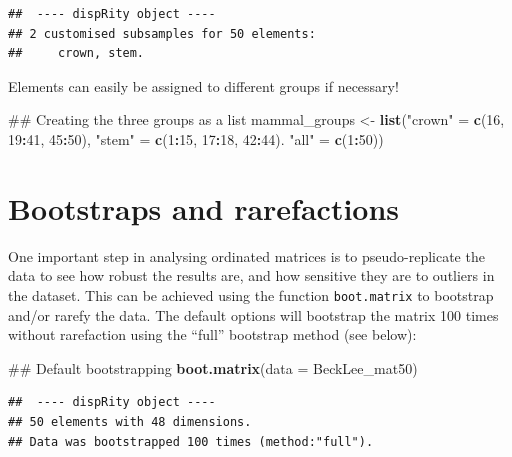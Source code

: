 \documentclass[]{book}
\newenvironment{Shaded}{\begin{snugshade}}{\end{snugshade}}
\newcommand{\KeywordTok}[1]{\textcolor[rgb]{0.13,0.29,0.53}{\textbf{#1}}}
\newcommand{\DataTypeTok}[1]{\textcolor[rgb]{0.13,0.29,0.53}{#1}}
\newcommand{\DecValTok}[1]{\textcolor[rgb]{0.00,0.00,0.81}{#1}}
\newcommand{\StringTok}[1]{\textcolor[rgb]{0.31,0.60,0.02}{#1}}
\newcommand{\OperatorTok}[1]{\textcolor[rgb]{0.81,0.36,0.00}{\textbf{#1}}}
\newcommand{\NormalTok}[1]{#1}
\theoremstyle{definition}
\theoremstyle{definition}
\theoremstyle{remark}
\begin{document}
\begin{verbatim}
##  ---- dispRity object ---- 
## 2 customised subsamples for 50 elements:
##     crown, stem.
\end{verbatim}

Elements can easily be assigned to different groups if necessary!

\begin{Shaded}
\begin{Highlighting}[]
\NormalTok{## Creating the three groups as a list}
\NormalTok{mammal_groups <-}\StringTok{ }\KeywordTok{list}\NormalTok{(}\StringTok{"crown"}\NormalTok{ =}\StringTok{ }\KeywordTok{c}\NormalTok{(}\DecValTok{16}\NormalTok{, }\DecValTok{19}\OperatorTok{:}\DecValTok{41}\NormalTok{, }\DecValTok{45}\OperatorTok{:}\DecValTok{50}\NormalTok{),}
                      \StringTok{"stem"}\NormalTok{ =}\StringTok{ }\KeywordTok{c}\NormalTok{(}\DecValTok{1}\OperatorTok{:}\DecValTok{15}\NormalTok{, }\DecValTok{17}\OperatorTok{:}\DecValTok{18}\NormalTok{, }\DecValTok{42}\OperatorTok{:}\DecValTok{44}\NormalTok{).}
                      \StringTok{"all"}\NormalTok{ =}\StringTok{ }\KeywordTok{c}\NormalTok{(}\DecValTok{1}\OperatorTok{:}\DecValTok{50}\NormalTok{))}
\end{Highlighting}
\end{Shaded}

\hypertarget{bootstraps-and-rarefactions}{\section{Bootstraps and
rarefactions}\label{bootstraps-and-rarefactions}}

One important step in analysing ordinated matrices is to
pseudo-replicate the data to see how robust the results are, and how
sensitive they are to outliers in the dataset. This can be achieved
using the function \texttt{boot.matrix} to bootstrap and/or rarefy the
data. The default options will bootstrap the matrix 100 times without
rarefaction using the ``full'' bootstrap method (see below):

\begin{Shaded}
\begin{Highlighting}[]
\NormalTok{## Default bootstrapping}
\KeywordTok{boot.matrix}\NormalTok{(}\DataTypeTok{data =}\NormalTok{ BeckLee_mat50)}
\end{Highlighting}
\end{Shaded}

\begin{verbatim}
##  ---- dispRity object ---- 
## 50 elements with 48 dimensions.
## Data was bootstrapped 100 times (method:"full").
\end{verbatim}
\end{document}
